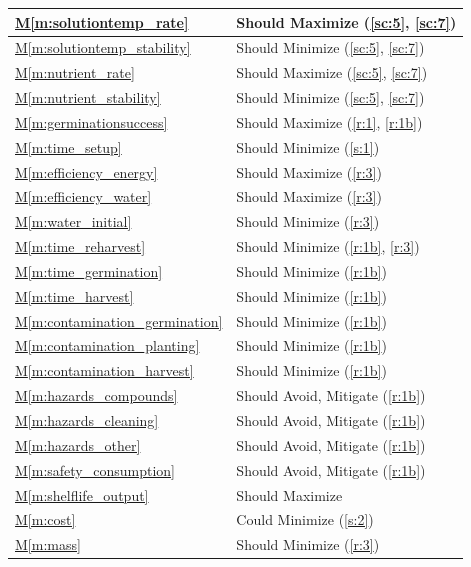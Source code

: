 \documentclass{report}
\newcommand{\mref}[1]{\hyperref[#1]{M\ref{#1}}}
\begin{document}
\begin{tabular}{|l|p{14.35cm}|}
    \hline
    \mref{m:solutiontemp_rate} & Should Maximize \hfill (\ref{sc:5}, \ref{sc:7}) \\
    \hline
    \mref{m:solutiontemp_stability} & Should Minimize \hfill (\ref{sc:5}, \ref{sc:7}) \\
    \hline
    \mref{m:nutrient_rate} & Should Maximize \hfill (\ref{sc:5}, \ref{sc:7}) \\
    \hline
    \mref{m:nutrient_stability} & Should Minimize \hfill (\ref{sc:5}, \ref{sc:7}) \\
    \hline
    \mref{m:germinationsuccess} & Should Maximize \hfill (\ref{r:1}, \ref{r:1b}) \\
    \hline
    \mref{m:time_setup} & Should Minimize \hfill (\ref{s:1}) \\
    \hline
    \mref{m:efficiency_energy} & Should Maximize \hfill (\ref{r:3}) \\
    \hline
    \mref{m:efficiency_water} & Should Maximize \hfill (\ref{r:3}) \\
    \hline
    \mref{m:water_initial} & Should Minimize \hfill (\ref{r:3}) \\
    \hline
    \mref{m:time_reharvest} & Should Minimize \hfill (\ref{r:1b}, \ref{r:3}) \\
    \hline
    \mref{m:time_germination} & Should Minimize \hfill (\ref{r:1b}) \\
    \hline
    \mref{m:time_harvest} & Should Minimize \hfill (\ref{r:1b}) \\
    \hline
    \mref{m:contamination_germination} & Should Minimize \hfill (\ref{r:1b}) \\
    \hline
    \mref{m:contamination_planting} & Should Minimize \hfill (\ref{r:1b}) \\
    \hline
    \mref{m:contamination_harvest} & Should Minimize \hfill (\ref{r:1b}) \\
    \hline
    \mref{m:hazards_compounds} & Should Avoid, Mitigate \hfill (\ref{r:1b}) \\
    \hline
    \mref{m:hazards_cleaning} & Should Avoid, Mitigate \hfill (\ref{r:1b}) \\
    \hline
    \mref{m:hazards_other} & Should Avoid, Mitigate \hfill (\ref{r:1b}) \\
    \hline
    \mref{m:safety_consumption} & Should Avoid, Mitigate \hfill (\ref{r:1b}) \\
    \hline
    \mref{m:shelflife_output} & Should Maximize \hfill \cite{applicantguide} \\
    \hline
    \mref{m:cost} & Could Minimize \hfill (\ref{s:2}) \\
    \hline
    \mref{m:mass} & Should Minimize \hfill (\ref{r:3}) \\
    \hline
\end{tabular}
\end{document}
